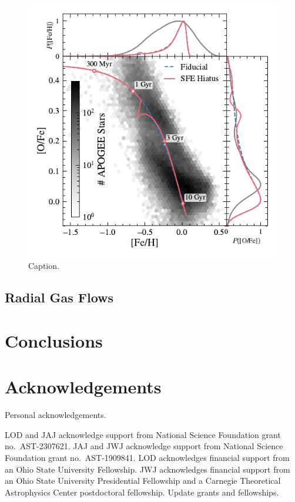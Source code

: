 \documentclass[twocolumn,twocolappendix,linenumbers]{aastex631}
\newcommand{\todo}[1]{{\color{red}#1}}
\begin{document}
\begin{figure}
    \centering
    \includegraphics{figures/onezone_sfe_hiatus.pdf}
    \caption{Caption.}
    \label{fig:onezone-sfe-hiatus}
\end{figure}

\subsection{Radial Gas Flows}
\label{sec:radial-flows}

\section{Conclusions}
\label{sec:conclusions}

\section*{Acknowledgements}

\todo{Personal acknowledgements.}

LOD and JAJ acknowledge support from National Science Foundation grant no.\ AST-2307621. JAJ and JWJ acknowledge support from National Science Foundation grant no.\ AST-1909841.
LOD acknowledges financial support from an Ohio State University Fellowship.
JWJ acknowledges financial support from an Ohio State University Presidential Fellowship and a Carnegie Theoretical Astrophysics Center postdoctoral fellowship. \todo{Update grants and fellowships.}
\end{document}
